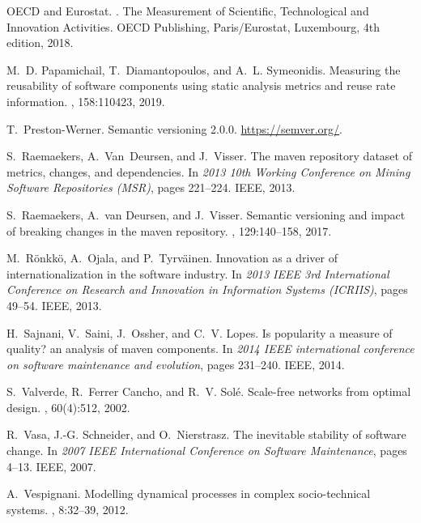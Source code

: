 \documentclass[10pt,conference]{IEEEtran}
\begin{document}
\begin{thebibliography}{10}
OECD and Eurostat.
.
\newblock The Measurement of Scientific, Technological and Innovation
  Activities. OECD Publishing, Paris/Eurostat, Luxembourg, 4th edition, 2018.

M.~D. Papamichail, T.~Diamantopoulos, and A.~L. Symeonidis.
\newblock Measuring the reusability of software components using static
  analysis metrics and reuse rate information.
, 158:110423, 2019.

T.~Preston-Werner.
\newblock Semantic versioning 2.0.0.
\newblock \url{https://semver.org/}.

S.~Raemaekers, A.~Van~Deursen, and J.~Visser.
\newblock The maven repository dataset of metrics, changes, and dependencies.
\newblock In {\em 2013 10th Working Conference on Mining Software Repositories
  (MSR)}, pages 221--224. IEEE, 2013.

S.~Raemaekers, A.~van Deursen, and J.~Visser.
\newblock Semantic versioning and impact of breaking changes in the maven
  repository.
, 129:140--158, 2017.

M.~R{\"o}nkk{\"o}, A.~Ojala, and P.~Tyrv{\"a}inen.
\newblock Innovation as a driver of internationalization in the software
  industry.
\newblock In {\em 2013 IEEE 3rd International Conference on Research and
  Innovation in Information Systems (ICRIIS)}, pages 49--54. IEEE, 2013.

H.~Sajnani, V.~Saini, J.~Ossher, and C.~V. Lopes.
\newblock Is popularity a measure of quality? an analysis of maven components.
\newblock In {\em 2014 IEEE international conference on software maintenance
  and evolution}, pages 231--240. IEEE, 2014.

S.~Valverde, R.~Ferrer Cancho, and R.~V. Sol\'e.
\newblock Scale-free networks from optimal design.
, 60(4):512, 2002.

R.~Vasa, J.-G. Schneider, and O.~Nierstrasz.
\newblock The inevitable stability of software change.
\newblock In {\em 2007 IEEE International Conference on Software Maintenance},
  pages 4--13. IEEE, 2007.

A.~Vespignani.
\newblock Modelling dynamical processes in complex socio-technical systems.
, 8:32--39, 2012.


\end{thebibliography}
\end{document}

